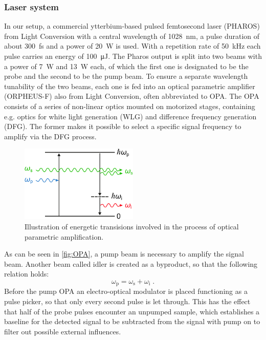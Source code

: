 \subsubsection*{Laser system}
In our setup, a commercial ytterbium-based pulsed femtosecond laser (PHAROS) from Light Conversion with a central wavelength of \qty{1028}{nm}, a pulse duration of about \qty{300}{fs} and a power of \qty{20}{W} is used.
With a repetition rate of \qty{50}{kHz} each pulse carries an energy of \qty{100}{\uJ}.
The Pharos output is split into two beams with a power of \qty{7}{W} and \qty{13}{W} each, of which the first one is designated to be the probe and the second to be the pump beam.
To ensure a separate wavelength tunability of the two beams, each one is fed into an optical parametric amplifier (ORPHEUS-F) also from Light Conversion, often abbreviated to OPA.
The OPA consists of a series of non-linear optics mounted on motorized stages, containing e.g. optics for white light generation (WLG) and difference frequency generation (DFG).
The former makes it possible to select a specific signal frequency to amplify via the DFG process.
\begin{figure}[ht]
    \centering
    \includegraphics[width=0.5\textwidth]{pictures/OPA.pdf}
    \caption{Illustration of energetic transisions involved in the process of optical parametric amplification.}
    \label{fig:OPA}
\end{figure}
As can be seen in \autoref{fig:OPA}, a pump beam is necessary to amplify the signal beam.
Another beam called idler is created as a byproduct, so that the following relation holds:
\begin{equation*}
    \omega_{\text{p}} = \omega_{\text{s}} + \omega_{\text{i}} \;.
\end{equation*}
Before the pump OPA an electro-optical modulator is placed functioning as a pulse picker, so that only every second pulse is let through.
This has the effect that half of the probe pulses encounter an unpumped sample, which establishes a baseline for the detected signal to be subtracted from the signal with pump on to filter out possible external influences.
